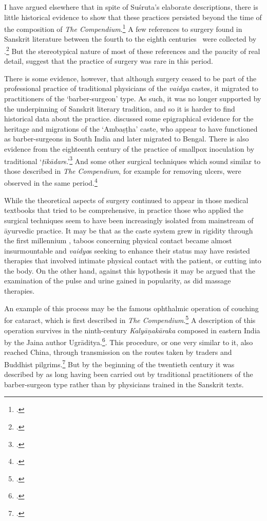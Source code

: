 I have argued elsewhere that in spite of Suśruta's elaborate descriptions, there
is little historical evidence to show that these practices persisted beyond the
time of the composition of \emph{The Compendium}.\footcite{wuja-indi} A few
references to surgery found in Sanskrit literature between the fourth to the
eighth centuries \AD\ were collected by
\citeauthor{shar-1972}.\footcite[74--8]{shar-1972}  But the stereotypical nature of
most of these references and the paucity of real detail, suggest that the practice
of surgery was rare in this period.

There is some evidence, however, that although surgery ceased to be part of
the professional practice of traditional physicians of the \emph{vaidya}
castes, it migrated to practitioners of the `barber-surgeon' type.  As such,
it was no longer supported by the underpinning of Sanskrit literary
tradition, and so it is harder to find historical data about the
practice. \citet{sirc-raks} discussed some epigraphical evidence for the
heritage and migrations of the `Ambaṣṭha' caste, who appear to have
functioned as barber-surgeons in South India and later migrated to Bengal.
There is also evidence from the eighteenth century of the practice of
smallpox inoculation by traditional 
`\emph{ṭīkādar}s.'\footcite{holw-acco,coul-acco} And some other surgical 
techniques which sound
similar to those described in \emph{The Compendium}, for example for removing 
ulcers, were
observed in the same period.\footcite[79]{babe-scie}


While the theoretical aspects of surgery continued to appear in those
medical textbooks that tried to be comprehensive, in practice those who
applied the surgical techniques seem to have been increasingly isolated from
mainstream of āyurvedic practice. It may be that as the caste system grew in
rigidity through the first millennium \AD, taboos concerning physical
contact became almost insurmountable and \emph{vaidya}s seeking to enhance
their status may have resisted therapies that involved intimate physical
contact with the patient, or cutting into the body.  On the other hand,
against this hypothesis it may be argued that the examination of the pulse
and urine gained in popularity, as did massage therapies.

An example of this process may be the famous ophthalmic operation of couching 
for
cataract, which is first described in \emph{The Compendium}.\footcite[Well
outlined by][378--9]{majn-1975} A description of this operation survives in the
ninth-century \emph{Kalyāṇa\-kāraka} composed in eastern India by the Jaina 
author
Ugrāditya.\footcites[67, n.\,76]{meul-1984}[IIA, 151\,ff]{meul-hist}[366--368,
375--378]{shas-kaly}. This procedure, or one very similar to it, also reached
China, through transmission on the routes taken by traders and Buddhist
pilgrims.\footcites[132--48]{unsc-medi}{desh-1999,desh-2000} But by the 
beginning
of the twentieth century it was described by \citet{elli-indi} as long having been
carried out by traditional practitioners of the barber-surgeon type rather than by
physicians trained in the Sanskrit texts.

